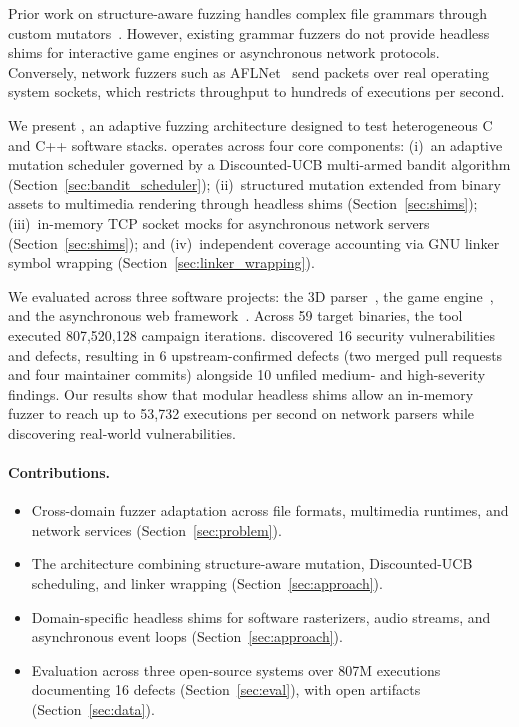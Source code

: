 Prior work on structure-aware fuzzing handles complex file grammars through custom mutators~\cite{aschermann2019nautilus}.
However, existing grammar fuzzers do not provide headless shims for interactive game engines or asynchronous network protocols.
Conversely, network fuzzers such as AFLNet~\cite{pham2020aflnet} send packets over real operating system sockets, which restricts throughput to hundreds of executions per second.

We present \tool, an adaptive fuzzing architecture designed to test heterogeneous C and C++ software stacks.
\tool operates across four core components:
(i)~an adaptive mutation scheduler governed by a Discounted-UCB multi-armed bandit algorithm (Section~\ref{sec:bandit_scheduler});
(ii)~structured mutation extended from binary assets to multimedia rendering through headless shims (Section~\ref{sec:shims});
(iii)~in-memory TCP socket mocks for asynchronous network servers (Section~\ref{sec:shims}); and
(iv)~independent coverage accounting via GNU linker symbol wrapping (Section~\ref{sec:linker_wrapping}).

We evaluated \tool across three software projects: the \fastgltf 3D parser~\cite{fastgltf_repo}, the \raylib game engine~\cite{raylib_repo}, and the \drogon asynchronous web framework~\cite{drogon_repo}.
Across 59 target binaries, the tool executed 807{,}520{,}128 campaign iterations.
\tool discovered 16 security vulnerabilities and defects, resulting in 6 upstream-confirmed defects (two merged pull requests and four maintainer commits) alongside 10 unfiled medium- and high-severity findings.
Our results show that modular headless shims allow an in-memory fuzzer to reach up to 53{,}732 executions per second on network parsers while discovering real-world vulnerabilities.

\paragraph{Contributions.}
\begin{itemize}
  \item Cross-domain fuzzer adaptation across file formats, multimedia runtimes, and network services (Section~\ref{sec:problem}).
  \item The \tool architecture combining structure-aware mutation, Discounted-UCB scheduling, and linker wrapping (Section~\ref{sec:approach}).
  \item Domain-specific headless shims for software rasterizers, audio streams, and asynchronous event loops (Section~\ref{sec:approach}).
  \item Evaluation across three open-source systems over 807M executions documenting 16 defects (Section~\ref{sec:eval}), with open artifacts (Section~\ref{sec:data}).
\end{itemize}
